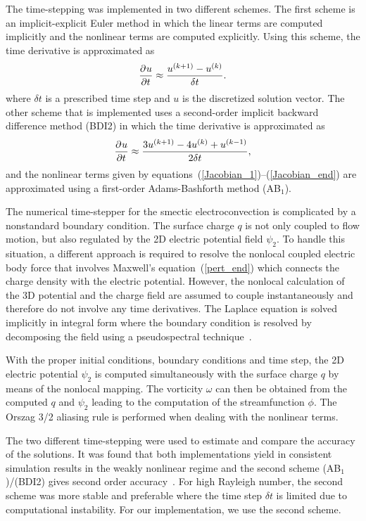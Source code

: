 The time-stepping was implemented in two different schemes. The first scheme is an implicit-explicit Euler method in which the linear terms are computed implicitly and the nonlinear terms are computed explicitly. Using this scheme, the time derivative is approximated as
\begin{equation}
\label{scheme_euler}
\pderiv[]{u}{t}  \approx \frac{u^{(k+1)} - u^{(k)}}{\delta t}.
\end{equation}
where $\delta t$ is a prescribed time step and $u$ is the discretized solution vector. The other scheme that is implemented uses a second-order implicit backward difference method (BDI2) in which the time derivative is approximated as
\begin{equation}
\label{BDI2}
\pderiv[]{u}{t} \approx \frac{3u^{(k+1)} -4u^{(k)}+ u^{(k-1)}}{2\delta t},
\end{equation}
and the nonlinear terms given by equations~(\ref{Jacobian_1})--(\ref{Jacobian_end}) are approximated using a first-order Adams-Bashforth method (AB$_1$).

The numerical time-stepper for the smectic electroconvection is complicated by a nonstandard boundary condition. The surface charge $q$ is not only coupled to flow motion, but also regulated by the 2D electric potential field $\psi_2$. To handle this situation, a different approach is required to resolve the nonlocal coupled electric body force that involves Maxwell's equation~(\ref{pert_end}) which connects the charge density with the electric potential. However, the nonlocal calculation of the 3D potential and the charge field are assumed to couple instantaneously and therefore do not involve any time derivatives. The Laplace equation is solved implicitly in integral form where the boundary condition is resolved by decomposing the field using a pseudospectral technique~\cite{PeiChunTsain}.

With the proper initial conditions, boundary conditions and time step, the 2D electric potential $\psi_2$ is computed simultaneously with the surface charge $q$ by means of the nonlocal mapping. The vorticity $\omega$ can then be obtained from the computed $q$ and $\psi_2$ leading to the computation of the streamfunction $\phi$. The Orszag 3/2 aliasing rule is performed when dealing with the nonlinear terms.

The two different time-stepping were used to estimate and compare the accuracy of the solutions. It was found that both implementations yield in consistent simulation results in the weakly nonlinear regime and the second scheme (AB$_1$)/(BDI2) gives second order accuracy~\cite{PeiChunTsain}. For high Rayleigh number, the second scheme was more stable and preferable where the time step $\delta t$ is limited due to computational instability. For our implementation, we use the second scheme.

